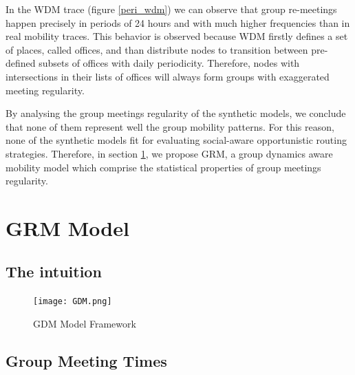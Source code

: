 \documentclass[10pt, conference, letterpaper]{IEEEtran}
\begin{document}
In the WDM trace (figure \ref{peri_wdm}) we can observe that group re-meetings happen precisely in periods of 24 hours and with much higher frequencies than in real mobility traces. This behavior is observed because WDM firstly defines a set of places, called offices, and than distribute nodes to transition between pre-defined subsets of offices with daily periodicity. Therefore, nodes with intersections in their lists of offices will always form groups with exaggerated meeting regularity.

By analysing the group meetings regularity of the synthetic models, we conclude that none of them represent well the group mobility patterns. For this reason, none of the synthetic models fit for evaluating social-aware opportunistic routing strategies. Therefore, in section \ref{sec:model}, we propose GRM, a group dynamics aware mobility model which comprise the statistical properties of group meetings regularity.

\section{GRM Model}\label{sec:model}



\subsection{The intuition}



\begin{figure}[!t]
\centering
\texttt{[image: GDM.png]}
\caption{GDM Model Framework}\label{GDM}
\end{figure}

\subsection{Group Meeting Times}

\end{document}
